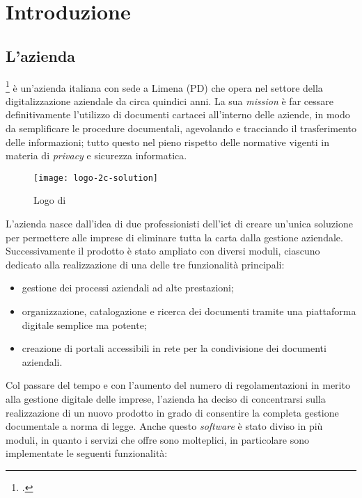 
\chapter{Introduzione}
\label{cap:introduzione}


\section{L'azienda}

\myCompany{} \companyTitle{}\footcite{site:2c-solution} è un'azienda italiana con sede a Limena (PD) che opera nel settore della digitalizzazione aziendale da circa quindici anni. La sua \textit{mission} è far cessare definitivamente l'utilizzo di documenti cartacei all'interno delle aziende, in modo da semplificare le procedure documentali, agevolando e tracciando il trasferimento delle informazioni; tutto questo nel pieno rispetto delle normative vigenti in materia di \textit{privacy} e sicurezza informatica.

\begin{figure}[!h] 
	\centering 
	\texttt{[image: logo-2c-solution]} 
	\caption{Logo di \myCompany{} \companyTitle}
\end{figure}

L'azienda nasce dall'idea di due professionisti dell'\gls{ict}\glsfirstoccur{} di creare un'unica soluzione per permettere alle imprese di eliminare tutta la carta dalla gestione aziendale. Successivamente il prodotto è stato ampliato con diversi moduli, ciascuno dedicato alla realizzazione di una delle tre funzionalità principali:

\begin{itemize}
	\item gestione dei processi aziendali ad alte prestazioni;
	\item organizzazione, catalogazione e ricerca dei documenti tramite una piattaforma digitale semplice ma potente;
	\item creazione di portali accessibili in rete per la condivisione dei documenti aziendali.
\end{itemize}

Col passare del tempo e con l'aumento del numero di regolamentazioni in merito alla gestione digitale delle imprese, l'azienda ha deciso di concentrarsi sulla realizzazione di un nuovo prodotto in grado di consentire la completa gestione documentale a norma di legge. Anche questo \textit{software} è stato diviso in più moduli, in quanto i servizi che offre sono molteplici, in particolare sono implementate le seguenti funzionalità:

